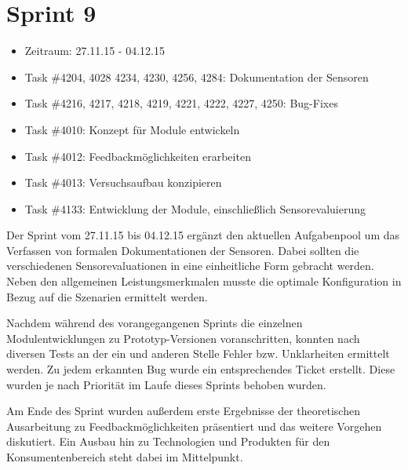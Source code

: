 \documentclass[12pt, oneside, smallheadings]{scrbook}
\begin{document}
\section{Sprint 9}
\begin{itemize}
	\item Zeitraum: 27.11.15 - 04.12.15 \newline
	\item Task \#4204, 4028 4234, 4230, 4256, 4284: Dokumentation der Sensoren
	\item Task \#4216, 4217, 4218, 4219, 4221, 4222, 4227, 4250: Bug-Fixes
	\item Task \#4010: Konzept für Module entwickeln
	\item Task \#4012: Feedbackmöglichkeiten erarbeiten
	\item Task \#4013: Versuchsaufbau konzipieren
	\item Task \#4133: Entwicklung der Module, einschließlich Sensorevaluierung\\
\end{itemize}
\noindent
Der Sprint vom 27.11.15 bis 04.12.15 ergänzt den aktuellen Aufgabenpool um das Verfassen von formalen  Dokumentationen der Sensoren. Dabei sollten die verschiedenen Sensorevaluationen in eine einheitliche Form gebracht werden. Neben den allgemeinen Leistungsmerkmalen musste die optimale Konfiguration in Bezug auf die Szenarien ermittelt werden.

Nachdem während des vorangegangenen Sprints die einzelnen Modulentwicklungen zu Prototyp-Versionen voranschritten, konnten nach diversen Tests an der ein und anderen Stelle Fehler bzw. Unklarheiten ermittelt werden. Zu jedem erkannten Bug wurde ein entsprechendes Ticket erstellt. Diese wurden je nach Priorität im Laufe dieses Sprints behoben wurden.

Am Ende des Sprint wurden außerdem erste Ergebnisse der theoretischen Ausarbeitung zu Feedbackmöglichkeiten präsentiert und das weitere Vorgehen diskutiert. Ein Ausbau hin zu Technologien und Produkten für den Konsumentenbereich steht dabei im Mittelpunkt.
\end{document}
